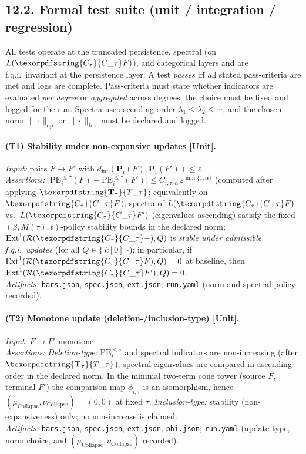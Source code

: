 \documentclass[11pt]{article}
\DeclareMathOperator{\Ext}{Ext}
\DeclareRobustCommand{\hyp}{\nobreakdash-}
\newcommand{\Rfun}{\mathcal{R}}
\numberwithin{equation}{section}
\theoremstyle{definition}
\DeclareRobustCommand{\Ttau}{\texorpdfstring{\ensuremath{\mathbf{T}_{\tau}}}{T\_\tau}}
\DeclareRobustCommand{\Ctau}{\texorpdfstring{\ensuremath{C_{\tau}}}{C\_\tau}}
\DeclareRobustCommand{\muc}{\mu_{\mathrm{Collapse}}}
\DeclareRobustCommand{\nuc}{\nu_{\mathrm{Collapse}}}
\DeclareRobustCommand{\Qtest}{\{\,k[0]\,\}}
\providecommand{\n}{\unskip\space}
\begin{document}
\subsection*{12.2. Formal test suite (unit / integration / regression)}
All tests operate at the truncated persistence, spectral (on \(L(\Ctau F)\)), and categorical layers and are f.q.i.\ invariant at the persistence layer. A test \emph{passes} iff all stated pass\hyp criteria are met and logs are complete. Pass\hyp criteria must state whether indicators are evaluated \emph{per degree} or \emph{aggregated} across degrees; the choice must be fixed and logged for the run. Spectra use ascending order \(\lambda_1\le\lambda_2\le\cdots\), and the chosen norm \(\|\cdot\|_{\mathrm{op}}\) or \(\|\cdot\|_{\mathrm{fro}}\) must be declared and logged.

\paragraph{(T1) Stability under non\hyp expansive updates [Unit].}
\emph{Input:} pairs \(F\to F'\) with \(d_{\mathrm{int}}(\mathbf{P}_i(F),\mathbf{P}_i(F'))\le \varepsilon\).\\\n\emph{Assertions:} \(\big|\mathrm{PE}^{\le\tau}_i(F)-\mathrm{PE}^{\le\tau}_i(F')\big|\le C_{i,\tau,\alpha}\,\varepsilon^{\min\{1,\alpha\}}\) (computed after applying \(\Ttau\); equivalently on \(\Ctau F\)); spectra of \(L(\Ctau F)\) vs.\ \(L(\Ctau F')\) (eigenvalues ascending) satisfy the fixed \((\beta,M(\tau),t)\)\hyp policy stability bounds in the declared norm; \(\Ext^1(\Rfun(\Ctau-),Q)\) is \emph{stable under admissible f.q.i.\ updates} (for all \(Q\in\Qtest\)); in particular, if \(\Ext^1(\Rfun(\Ctau F),Q)=0\) at baseline, then \(\Ext^1(\Rfun(\Ctau F'),Q)=0\).\\\n\emph{Artifacts:} \texttt{bars.json}, \texttt{spec.json}, \texttt{ext.json}; \texttt{run.yaml} (norm and spectral policy recorded).

\paragraph{(T2) Monotone update (deletion\hyp /inclusion\hyp type) [Unit].}
\emph{Input:} \(F\to F'\) monotone.\\\n\emph{Assertions:} \emph{Deletion\hyp type:} \(\mathrm{PE}^{\le\tau}_i\) and spectral indicators are non\hyp increasing (after \(\Ttau\)); spectral eigenvalues are compared in ascending order in the declared norm. In the minimal two\hyp term cone tower (source \(F\), terminal \(F'\)) the comparison map \(\phi_{i,\tau}\) is an isomorphism, hence \((\muc,\nuc)=(0,0)\) at fixed \(\tau\).
\emph{Inclusion\hyp type:} stability (non\hyp expansiveness) only; no non\hyp increase is claimed.\\\n\emph{Artifacts:} \texttt{bars.json}, \texttt{spec.json}, \texttt{ext.json}, \texttt{phi.json}; \texttt{run.yaml} (update type, norm choice, and \((\muc,\nuc)\) recorded).
\end{document}

